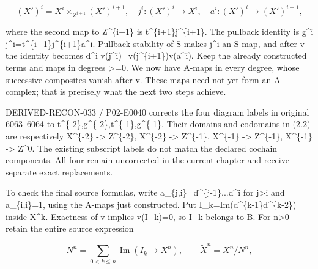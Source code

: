\[
 (X')^i=X^i\mathbin{\times}_{Z^{i+1}}(X')^{i+1},\quad
 j^i:(X')^i\longrightarrow X^i,\quad
 a^i:(X')^i\longrightarrow (X')^{i+1},                    \tag{2.2}
\]

where the second map to Z\textasciicircum{}\{i\allowbreak{}+1\} is t\textasciicircum{}\{i\allowbreak{}+1\}j\textasciicircum{}\{i\allowbreak{}+1\}. The pullback identity is g\^{}i j\textasciicircum{}i\allowbreak{}=t\textasciicircum{}\{i\allowbreak{}+1\}j\textasciicircum{}\{i\allowbreak{}+1\}a\textasciicircum{}i. Pullback stability of S makes j\^{}i an S-map,\allowbreak{} and after v the identity becomes d\^{}i v(j\textasciicircum{}i)\allowbreak{}\allowbreak{}=v(j\textasciicircum{}\{i\allowbreak{}+1\})\allowbreak{}v(a\textasciicircum{}i)\allowbreak{}. Keep the already constructed terms and maps in degrees >\allowbreak{}=0. We now have A-maps in every degree,\allowbreak{} whose successive composites vanish after v. These maps need not yet form an A-complex; that is precisely what the next two steps achieve.

DERIVED-RECON-033 /\allowbreak{} P02-E0040 corrects the four diagram labels in original 6063–\allowbreak{}6064 to t\textasciicircum{}\{-2\},\allowbreak{}g\textasciicircum{}\{-2\},\allowbreak{}t\textasciicircum{}\{-1\},\allowbreak{}g\textasciicircum{}\{-1\}. Their domains and codomains in (2.2)\allowbreak{} are respectively X\^{}\{-2\} \allowbreak{}-> Z\textasciicircum{}\{-2\},\allowbreak{} X\^{}\{-2\} \allowbreak{}-> Z\textasciicircum{}\{-1\},\allowbreak{} X\^{}\{-1\} \allowbreak{}-> Z\textasciicircum{}\{-1\},\allowbreak{} X\^{}\{-1\} \allowbreak{}-> Z\^{}0. The existing subscript labels do not match the declared cochain components. All four remain uncorrected in the current chapter and receive separate exact replacements.

To check the final source formulas,\allowbreak{} write a\_\allowbreak{}\{j,\allowbreak{}i\}\allowbreak{}=d\textasciicircum{}\{j-1\}...d\textasciicircum{}i for j\textgreater i and a\_\allowbreak{}\{i,\allowbreak{}i\}\allowbreak{}=1,\allowbreak{} using the A-maps just constructed. Put I\_\allowbreak{}k\allowbreak{}=Im(d\textasciicircum{}\{k-1\}d\textasciicircum{}\{k-2\})\allowbreak{} inside X\^{}k. Exactness of v implies v(I\_\allowbreak{}k)\allowbreak{}\allowbreak{}=0,\allowbreak{} so I\_\allowbreak{}k belongs to B. For n\textgreater0 retain the entire source expression

\[
 N^n=\sum_{0<k\le n}\operatorname{Im}
                  (I_k\longrightarrow X^n),\qquad
 \widetilde X^n=X^n/N^n,                                \tag{2.3}
\]

